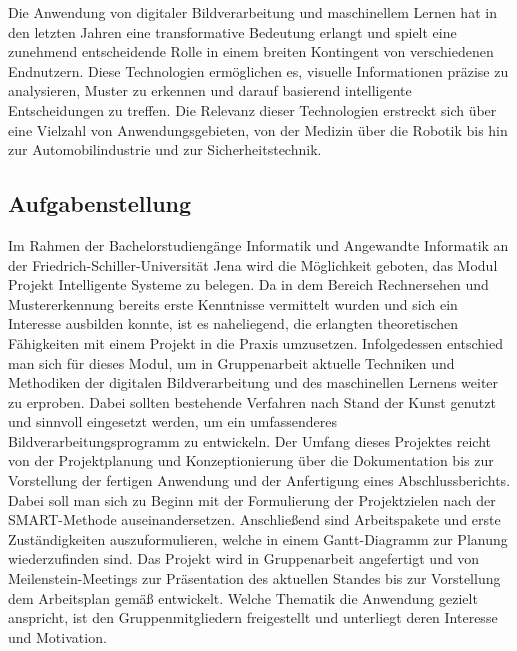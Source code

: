 Die Anwendung von digitaler Bildverarbeitung und maschinellem Lernen hat in den letzten Jahren eine transformative Bedeutung erlangt und spielt eine zunehmend entscheidende Rolle in einem breiten Kontingent von verschiedenen Endnutzern. Diese Technologien ermöglichen es, visuelle Informationen präzise zu analysieren, Muster zu erkennen und darauf basierend intelligente Entscheidungen zu treffen. Die Relevanz dieser Technologien erstreckt sich über eine Vielzahl von Anwendungsgebieten, von der Medizin über die Robotik bis hin zur Automobilindustrie und zur Sicherheitstechnik.

\subsection{Aufgabenstellung}
Im Rahmen der Bachelorstudiengänge Informatik und Angewandte Informatik an der Friedrich-Schiller-Universität Jena wird die Möglichkeit geboten, das Modul \glqq Projekt Intelligente Systeme\grqq{} zu belegen. Da in dem Bereich Rechnersehen und Mustererkennung bereits erste Kenntnisse vermittelt wurden und sich ein Interesse ausbilden konnte, ist es naheliegend, die erlangten theoretischen Fähigkeiten mit einem Projekt in die Praxis umzusetzen. Infolgedessen entschied man sich für dieses Modul, um in Gruppenarbeit aktuelle Techniken und Methodiken der digitalen Bildverarbeitung und des maschinellen Lernens weiter zu erproben. Dabei sollten bestehende Verfahren nach Stand der Kunst genutzt und sinnvoll eingesetzt werden, um ein umfassenderes Bildverarbeitungsprogramm zu entwickeln. Der Umfang dieses Projektes reicht von der Projektplanung und Konzeptionierung über die Dokumentation bis zur Vorstellung der fertigen Anwendung und der Anfertigung eines Abschlussberichts. Dabei soll man sich zu Beginn mit der Formulierung der Projektzielen nach der SMART-Methode auseinandersetzen. Anschließend sind Arbeitspakete und erste Zuständigkeiten auszuformulieren, welche in einem Gantt-Diagramm zur Planung wiederzufinden sind. Das Projekt wird in Gruppenarbeit angefertigt und von Meilenstein-Meetings zur Präsentation des aktuellen Standes bis zur Vorstellung dem Arbeitsplan gemäß entwickelt. Welche Thematik die Anwendung gezielt anspricht, ist den Gruppenmitgliedern freigestellt und unterliegt deren Interesse und Motivation.

